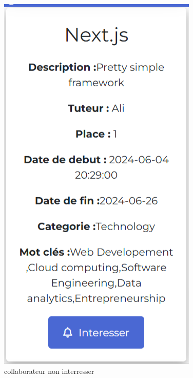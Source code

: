 \documentclass{article}
\begin{document}
                \begin{figure}[h!]
                    \centering
                    \begin{minipage}{0.45\textwidth}
                        \centering
                        \includegraphics[width=0.8\linewidth]{assets/webSite/notInterested.png}
                        \caption{collaborateur non interresser}
                    \end{minipage}
                    \hfill
                    \begin{minipage}{0.45\textwidth}
                        \centering

\end{minipage}
\end{figure}
\end{document}
